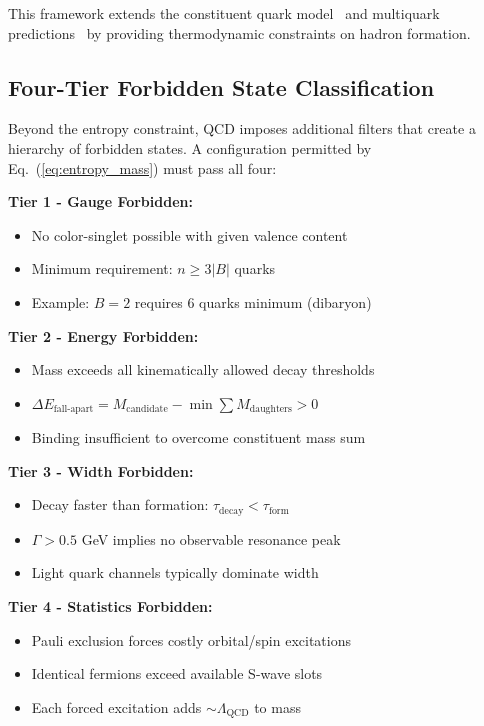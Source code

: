 \documentclass[12pt,a4paper]{article}
\begin{document}
This framework extends the constituent quark model~\cite{Gell-Mann1964} and multiquark predictions~\cite{Jaffe1977} by providing thermodynamic constraints on hadron formation.

\subsection{Four-Tier Forbidden State Classification}

Beyond the entropy constraint, QCD imposes additional filters that create a hierarchy of forbidden states. A configuration permitted by Eq.~(\ref{eq:entropy_mass}) must pass all four:

\textbf{Tier 1 - Gauge Forbidden:} 
\begin{itemize}
\item No color-singlet possible with given valence content
\item Minimum requirement: $n \geq 3|B|$ quarks
\item Example: $B=2$ requires 6 quarks minimum (dibaryon)
\end{itemize}

\textbf{Tier 2 - Energy Forbidden:} 
\begin{itemize}
\item Mass exceeds all kinematically allowed decay thresholds
\item $\Delta E_{\text{fall-apart}} = M_{\text{candidate}} - \min\sum M_{\text{daughters}} > 0$
\item Binding insufficient to overcome constituent mass sum
\end{itemize}

\textbf{Tier 3 - Width Forbidden:} 
\begin{itemize}
\item Decay faster than formation: $\tau_{\text{decay}} < \tau_{\text{form}}$
\item $\Gamma > 0.5$ GeV implies no observable resonance peak
\item Light quark channels typically dominate width
\end{itemize}

\textbf{Tier 4 - Statistics Forbidden:} 
\begin{itemize}
\item Pauli exclusion forces costly orbital/spin excitations
\item Identical fermions exceed available S-wave slots
\item Each forced excitation adds $\sim\Lambda_{\text{QCD}}$ to mass
\end{itemize}
\end{document}
